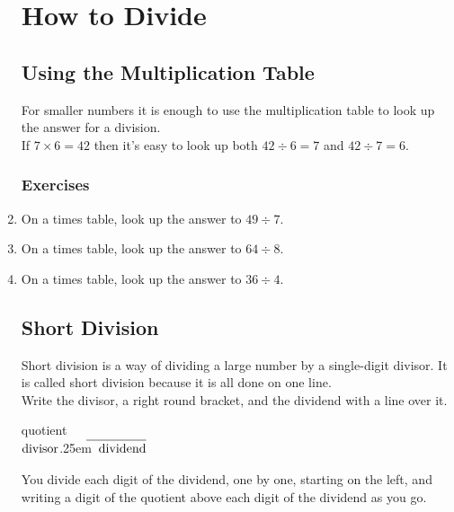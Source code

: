 \documentclass{article}
\newcommand\mylongdiv[2]{%
$\strut#1$\kern.25em\smash{\raise.3ex\hbox{$\big)$}}$\mkern-8mu
        \overline{\quad\strut#2}$}
\begin{document}
\begin{enumerate}
\pagebreak

\section*{How to Divide}

\subsection*{Using the Multiplication Table}

For smaller numbers it is enough to use the multiplication table to look up the answer for a division.\\

If $7 \times 6 = 42$ then it's easy to look up both $42 \div 6 = 7$ and $42 \div 7 = 6$.\\

\subsubsection{Exercises}

\item On a times table, look up the answer to $49 \div 7$.
\item On a times table, look up the answer to $64 \div 8$.
\item On a times table, look up the answer to $36 \div 4$.

\newpage

\subsection*{Short Division}
Short division is a way of dividing a large number by a single-digit divisor. It is called short division because it is all done on one line.\\

Write the divisor, a right round bracket, and the dividend with a line over it.

\begin{center}
\hspace{3.5em}\textrm{quotient}\\
\mylongdiv{\textrm{divisor}}{\textrm{dividend}}\\
\end{center}

You divide each digit of the dividend, one by one, starting on the left, and writing a digit of the quotient above each digit of the dividend as you go.\\


\end{enumerate}
\end{document}
